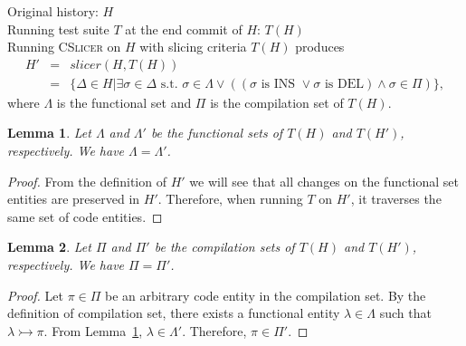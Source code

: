 \documentclass[11pt,letterpaper]{article}
\author{Annonymous authors}
\newtheorem{lemma}{Lemma}
\begin{document}
  \noindent
  Original history: $H$\\
  Running test suite $T$ at the end commit of $H$: $T(H)$\\
  Running \textsc{CSlicer} on $H$ with slicing criteria $T(H)$ produces
  \[
  \begin{array}{rcl}
    H' & = & slicer(H, T(H)) \\
       & = & \{\Delta \in H | \exists \sigma \in \Delta\text{ 
      s.t. } \sigma \in \Lambda \vee ((\sigma\text{ is INS }\vee \sigma\text{ 
      is DEL}) \wedge \sigma \in \Pi)\},
  \end{array}
  \]
  where $\Lambda$ is the functional set and $\Pi$ is the compilation set of 
  $T(H)$.
  
  \vspace{.2in}

  \begin{lemma}
    Let $\Lambda$ and $\Lambda'$ be the functional sets of $T(H)$ and $T(H')$, 
    respectively. We have $\Lambda = \Lambda'$.
    \label{lemma.1}
  \end{lemma}
  \begin{proof}
    From the definition of $H'$ we will see that all changes on the functional 
    set entities are preserved in $H'$.
    Therefore, when running $T$ on $H'$, it traverses the same set of code 
    entities.
  \end{proof}

  \begin{lemma}
    Let $\Pi$ and $\Pi'$ be the compilation sets of $T(H)$ and $T(H')$, 
    respectively. We have $\Pi = \Pi'$.
  \end{lemma}
  \begin{proof}
    Let $\pi \in \Pi$ be an arbitrary code entity in the compilation set.
    By the definition of compilation set, there exists a functional entity 
    $\lambda \in \Lambda$ such that $\lambda \rightarrowtail \pi$.
    From Lemma~\ref{lemma.1}, $\lambda \in \Lambda'$. 
    Therefore, $\pi \in \Pi'$.
  \end{proof}
\end{document}

